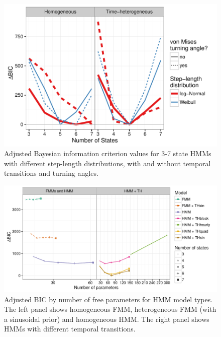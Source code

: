 \documentclass{bmcart}
\begin{document}
\begin{backmatter}
\clearpage

  \begin{figure}[h!]
   \includegraphics[width=5in]{figure/BICred_plot-1}
  \caption{ Adjusted Bayesian information criterion values for 3-7 state HMMs with different step-length distributions, with and without temporal transitions and turning angles.}
      \end{figure}
      
\clearpage

  \begin{figure}[h!]
   \includegraphics[width=5in]{figure/adj_BIC_comparisons-1}
  \caption{ Adjusted BIC by number of free parameters for HMM model types. The left panel shows homogeneous FMM, heterogeneous FMM (with a sinusoidal prior) and homogeneous HMM. The right panel shows HMMs with different temporal transitions.}
      \end{figure}
      
\clearpage


\end{backmatter}
\end{document}
